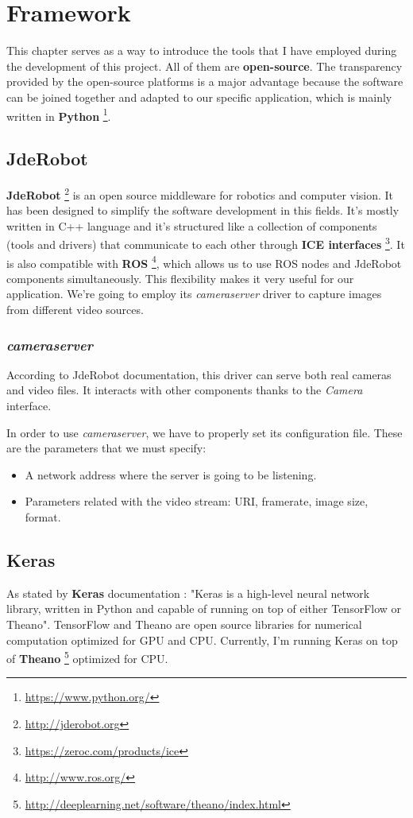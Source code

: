 \chapter{Framework}\label{cap.framework}
This chapter serves as a way to introduce the tools that I have employed during the development of this project. All of them are \textbf{open-source}. The transparency provided by the open-source platforms is a major advantage because the software can be joined together and adapted to our specific application, which is mainly written in \textbf{Python} \footnote{\url{https://www.python.org/}}.

\section{JdeRobot}
\textbf{JdeRobot} \footnote{\url{http://jderobot.org}} is an open source middleware for robotics and computer vision. It has been designed to simplify the software development in this fields. It's mostly written in C++ language and it's structured like a collection of components (tools and drivers) that communicate to each other through \textbf{ICE interfaces} \footnote{\url{https://zeroc.com/products/ice}}. It is also compatible with \textbf{ROS} \footnote{\url{http://www.ros.org/}}, which allows us to use ROS nodes and JdeRobot components simultaneously. This flexibility makes it very useful for our application.
We're going to employ its \textit{cameraserver} driver to capture images from different video sources.

\subsection{\textit{cameraserver}}
According to JdeRobot documentation, this driver can serve both real cameras and video files. It interacts with other components thanks to the \textit{Camera} interface.

In order to use \textit{cameraserver}, we have to properly set its configuration file. These are the parameters that we must specify:
\begin{itemize}
    \item A network address where the server is going to be listening.
    \item Parameters related with the video stream: URI, framerate, image size, format.
\end{itemize}

\section{Keras}
As stated by \textbf{Keras} documentation \cite{chollet2015keras}: "Keras is a high-level neural network library, written in Python and capable of running on top of either TensorFlow or Theano". TensorFlow and Theano are open source libraries for numerical computation optimized for GPU and CPU. Currently, I'm running Keras on top of \textbf{Theano} \footnote{\url{http://deeplearning.net/software/theano/index.html}} optimized for CPU.

